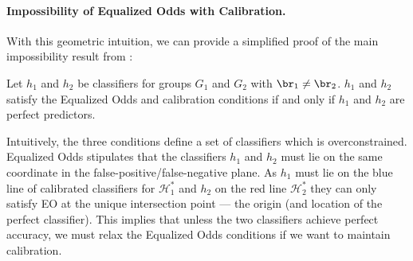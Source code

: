 \paragraph{Impossibility of Equalized Odds with Calibration.}
%
With this geometric intuition, we can provide a simplified
proof of the main impossibility
result from \cite{kleinberg2016inherent}:
%
\begin{thm*}
  \label{thm:orig-impossibility}
  Let $h_1$ and $h_2$ be classifiers for groups $G_1$ and $G_2$ with $\br_1 \neq \br_2$.
  $h_1$ and $h_2$ satisfy the Equalized Odds and calibration conditions
  if and only if $h_1$ and $h_2$ are perfect predictors.
\end{thm*}
%
Intuitively, the three conditions define a set of classifiers which
is overconstrained.
Equalized Odds stipulates that the classifiers $h_1$ and
$h_2$ must lie on the same coordinate in the false-positive/false-negative
plane. As $h_1$ must lie on the blue line of calibrated classifiers for $\mathcal{H}_1^*$ and $h_2$ on the red line $\mathcal{H}_2^*$ they can only satisfy EO at the unique intersection point --- the origin (and location of the perfect classifier).
This implies that unless the two classifiers achieve perfect accuracy,
we must relax the Equalized Odds conditions if we want to
maintain calibration.


